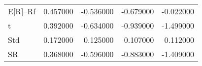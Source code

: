 \begin{tabular}{lrrrr}
\toprule
\midrule
E[R]--Rf & 0.457000 & -0.536000 & -0.679000 & -0.022000 \\
t & 0.392000 & -0.634000 & -0.939000 & -1.499000 \\
Std & 0.172000 & 0.125000 & 0.107000 & 0.112000 \\
SR & 0.368000 & -0.596000 & -0.883000 & -1.409000 \\
\bottomrule
\end{tabular}
